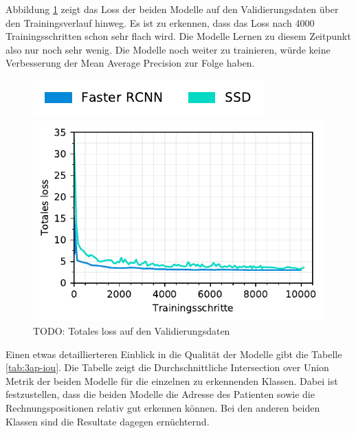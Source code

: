
Abbildung \ref{fig:3ap-map:loss} zeigt das Loss der beiden Modelle auf den Validierungsdaten über den Trainingsverlauf hinweg. Es ist zu erkennen, dass das Loss nach 4000 Trainingsschritten schon sehr flach wird. Die Modelle Lernen zu diesem Zeitpunkt also nur noch sehr wenig. Die Modelle noch weiter zu trainieren, würde keine Verbesserung der Mean Average Precision zur Folge haben.


\begin{figure}[h!] 
    \captionsetup{width=.9\linewidth}
    \caption{TODO: Totales loss auf den Validierungsdaten}
    \label{fig:3ap-map:loss}
    \centering
    \includegraphics[scale=1]{graphics/matplot/img-detection__legend_1.pdf}
    
    \includegraphics[scale=1]{graphics/matplot/img-detection__all__loss.pdf}
\end{figure}

Einen etwas detaillierteren Einblick in die Qualität der Modelle gibt die Tabelle \ref{tab:3ap-iou}. Die Tabelle zeigt die Durchschnittliche Intersection over Union Metrik der beiden Modelle für die einzelnen zu erkennenden Klassen. Dabei ist festzustellen, dass die beiden Modelle die Adresse des Patienten sowie die Rechnungspositionen relativ gut erkennen können. Bei den anderen beiden Klassen sind die Resultate dagegen ernüchternd.

